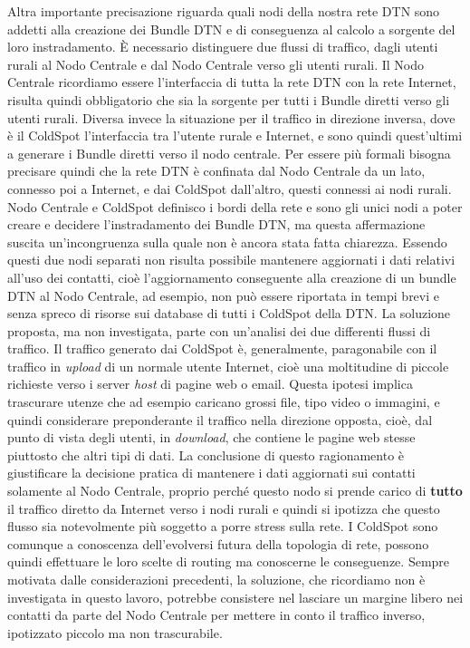 \documentclass[a4paper]{article}
\begin{document}
		Altra importante precisazione riguarda quali nodi della nostra rete DTN sono addetti alla creazione dei Bundle DTN e di conseguenza al calcolo a sorgente del loro instradamento. \`E necessario distinguere due flussi di traffico, dagli utenti rurali al Nodo Centrale e dal Nodo Centrale verso gli utenti rurali. Il Nodo Centrale ricordiamo essere l'interfaccia di tutta la rete DTN con la rete Internet, risulta quindi obbligatorio che sia la sorgente per tutti i Bundle diretti verso gli utenti rurali. Diversa invece la situazione per il traffico in direzione inversa, dove è il ColdSpot l'interfaccia tra l'utente rurale e Internet, e sono quindi quest'ultimi a generare i Bundle diretti verso il nodo centrale. Per essere più formali bisogna precisare quindi che la rete DTN è confinata dal Nodo Centrale da un lato, connesso poi a Internet, e dai ColdSpot dall'altro, questi connessi ai nodi rurali. Nodo Centrale e ColdSpot definisco i bordi della rete e sono gli unici nodi a poter creare e decidere l'instradamento dei Bundle DTN, ma questa affermazione suscita un'incongruenza sulla quale non è ancora stata fatta chiarezza. Essendo questi due nodi separati non risulta possibile mantenere aggiornati i dati relativi all'uso dei contatti, cioè l'aggiornamento conseguente alla creazione di un bundle DTN al Nodo Centrale, ad esempio, non può essere riportata in tempi brevi e senza spreco di risorse sui database di tutti i ColdSpot della DTN. La soluzione proposta, ma non investigata, parte con un'analisi dei due differenti flussi di traffico. Il traffico generato dai ColdSpot è, generalmente, paragonabile con il traffico in {\it upload} di un normale utente Internet, cioè una moltitudine di piccole richieste verso i server {\it host} di pagine web o email. Questa ipotesi implica trascurare utenze che ad esempio caricano grossi file, tipo video o immagini, e quindi considerare preponderante il traffico nella direzione opposta, cioè, dal punto di vista degli utenti, in {\it download}, che contiene le pagine web stesse piuttosto che altri tipi di dati. La conclusione di questo ragionamento è giustificare la decisione pratica di mantenere i dati aggiornati sui contatti solamente al Nodo Centrale, proprio perché questo nodo si prende carico di {\bf tutto} il traffico diretto da Internet verso i nodi rurali e quindi si ipotizza che questo flusso sia notevolmente più soggetto a porre stress sulla rete. I ColdSpot sono comunque a conoscenza dell'evolversi futura della topologia di rete, possono quindi effettuare le loro scelte di routing ma conoscerne le conseguenze. Sempre motivata dalle considerazioni precedenti, la soluzione, che ricordiamo non è investigata in questo lavoro, potrebbe consistere nel lasciare un margine libero nei contatti da parte del Nodo Centrale per mettere in conto il traffico inverso, ipotizzato piccolo ma non trascurabile. 
		
\end{document}
